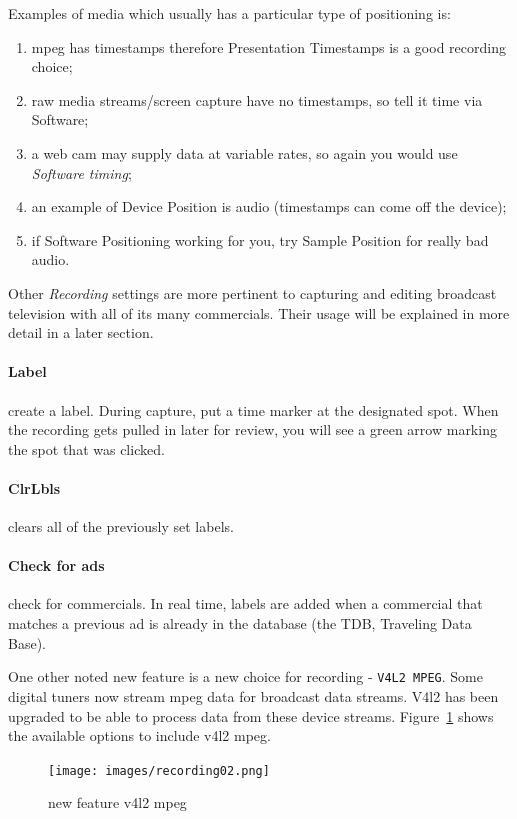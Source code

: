 Examples of media which usually has a particular type of positioning is:

\begin{enumerate}
    \item mpeg has timestamps therefore Presentation Timestamps is a good recording choice;
    \item raw media streams/screen capture have no timestamps, so tell it time via Software;
    \item a web cam may supply data at variable rates, so again you would use \textit{Software timing};
    \item an example of Device Position is audio (timestamps can come off the device);
    \item if Software Positioning working for you, try Sample Position for really bad audio.
\end{enumerate}

Other \textit{Recording} settings are more pertinent to capturing and editing broadcast television with all of its many commercials.  Their usage will be explained in more detail in a later section.
\paragraph{Label} create a label.  During capture, put a time marker at the designated spot.  When the recording 
gets pulled in later for review, you will see a green arrow marking the spot that was clicked.
\paragraph{ClrLbls} clears all of the previously set labels.
\paragraph{Check for ads} check for commercials.  In real time, labels are added when a commercial that matches
a previous ad is already in the database (the TDB, Traveling Data Base).

One other noted new feature is a new choice for recording -  \texttt{V4L2 MPEG}.  Some digital tuners now stream mpeg data for broadcast data streams.  V4l2 has been upgraded to be able to process data from these device streams.  Figure~\ref{fig:recording02} shows the available options to include v4l2 mpeg.

\begin{figure}[htpb]
    \centering
    \texttt{[image: images/recording02.png]}
    \caption{new feature v4l2 mpeg}
    \label{fig:recording02}
\end{figure}

